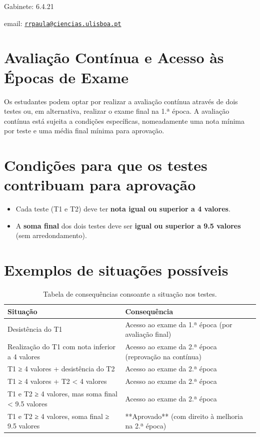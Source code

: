 \documentclass[
]{book}
\providecommand{\tightlist}{%
  \setlength{\itemsep}{0pt}\setlength{\parskip}{0pt}}
\begin{document}
Gabinete: 6.4.21

email:
\href{mailto:rrpaula@ciencias.ulisboa.pt}{\nolinkurl{rrpaula@ciencias.ulisboa.pt}}

\section{Avaliação Contínua e Acesso às Épocas de Exame}\label{avaliauxe7uxe3o-contuxednua-e-acesso-uxe0s-uxe9pocas-de-exame}

Os estudantes podem optar por realizar a avaliação contínua através de dois testes ou, em alternativa, realizar o exame final na 1.ª época. A avaliação contínua está sujeita a condições específicas, nomeadamente uma nota mínima por teste e uma média final mínima para aprovação.

\section{Condições para que os testes contribuam para aprovação}\label{condiuxe7uxf5es-para-que-os-testes-contribuam-para-aprovauxe7uxe3o}

\begin{itemize}
\tightlist
\item
  Cada teste (T1 e T2) deve ter \textbf{nota igual ou superior a 4 valores}.
\item
  A \textbf{soma final} dos dois testes deve ser \textbf{igual ou superior a 9.5 valores} (sem arredondamento).
\end{itemize}

\section{Exemplos de situações possíveis}\label{exemplos-de-situauxe7uxf5es-possuxedveis}

\begin{table}

\caption{\label{tab:unnamed-chunk-2}Tabela de consequências consoante a situação nos testes.}
\centering
\begin{tabular}[t]{ll}
\toprule
Situação & Consequência\\
\midrule
Desistência do T1 & Acesso ao exame da 1.ª época (por avaliação final)\\
Realização do T1 com nota inferior a 4 valores & Acesso ao exame da 2.ª época (reprovação na contínua)\\
T1 ≥ 4 valores + desistência do T2 & Acesso ao exame da 2.ª época\\
T1 ≥ 4 valores + T2 < 4 valores & Acesso ao exame da 2.ª época\\
T1 e T2 ≥ 4 valores, mas soma final < 9.5 valores & Acesso ao exame da 2.ª época\\
\addlinespace
T1 e T2 ≥ 4 valores, soma final ≥ 9.5 valores & **Aprovado** (com direito à melhoria na 2.ª época)\\
\bottomrule
\end{tabular}
\end{table}
\end{document}
